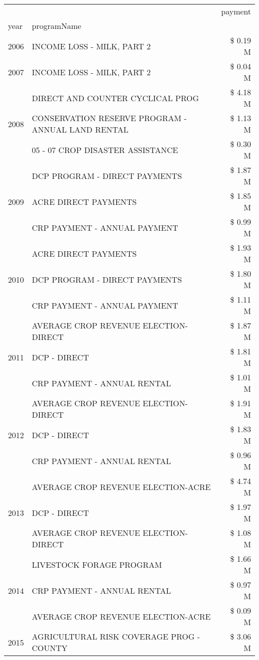 \begin{tabular}{llr}
\toprule
 &  & payment \\
year & programName &  \\
\midrule
2006 & INCOME LOSS - MILK, PART 2 & \$ 0.19 M \\
\cline{1-3}
2007 & INCOME LOSS - MILK, PART 2 & \$ 0.04 M \\
\cline{1-3}
\multirow[t]{3}{*}{2008} & DIRECT AND COUNTER CYCLICAL PROG & \$ 4.18 M \\
 & CONSERVATION RESERVE PROGRAM - ANNUAL LAND RENTAL & \$ 1.13 M \\
 & 05 - 07 CROP DISASTER ASSISTANCE & \$ 0.30 M \\
\cline{1-3}
\multirow[t]{3}{*}{2009} & DCP PROGRAM - DIRECT PAYMENTS & \$ 1.87 M \\
 & ACRE DIRECT PAYMENTS & \$ 1.85 M \\
 & CRP PAYMENT - ANNUAL PAYMENT & \$ 0.99 M \\
\cline{1-3}
\multirow[t]{3}{*}{2010} & ACRE DIRECT PAYMENTS & \$ 1.93 M \\
 & DCP PROGRAM - DIRECT PAYMENTS & \$ 1.80 M \\
 & CRP PAYMENT - ANNUAL PAYMENT & \$ 1.11 M \\
\cline{1-3}
\multirow[t]{3}{*}{2011} & AVERAGE CROP REVENUE ELECTION-DIRECT & \$ 1.87 M \\
 & DCP - DIRECT & \$ 1.81 M \\
 & CRP PAYMENT - ANNUAL RENTAL & \$ 1.01 M \\
\cline{1-3}
\multirow[t]{3}{*}{2012} & AVERAGE CROP REVENUE ELECTION-DIRECT & \$ 1.91 M \\
 & DCP - DIRECT & \$ 1.83 M \\
 & CRP PAYMENT - ANNUAL RENTAL & \$ 0.96 M \\
\cline{1-3}
\multirow[t]{3}{*}{2013} & AVERAGE CROP REVENUE ELECTION-ACRE & \$ 4.74 M \\
 & DCP - DIRECT & \$ 1.97 M \\
 & AVERAGE CROP REVENUE ELECTION-DIRECT & \$ 1.08 M \\
\cline{1-3}
\multirow[t]{3}{*}{2014} & LIVESTOCK FORAGE PROGRAM & \$ 1.66 M \\
 & CRP PAYMENT - ANNUAL RENTAL & \$ 0.97 M \\
 & AVERAGE CROP REVENUE ELECTION-ACRE & \$ 0.09 M \\
\cline{1-3}
\multirow[t]{3}{*}{2015} & AGRICULTURAL RISK COVERAGE PROG - COUNTY & \$ 3.06 M \\

\end{tabular}
